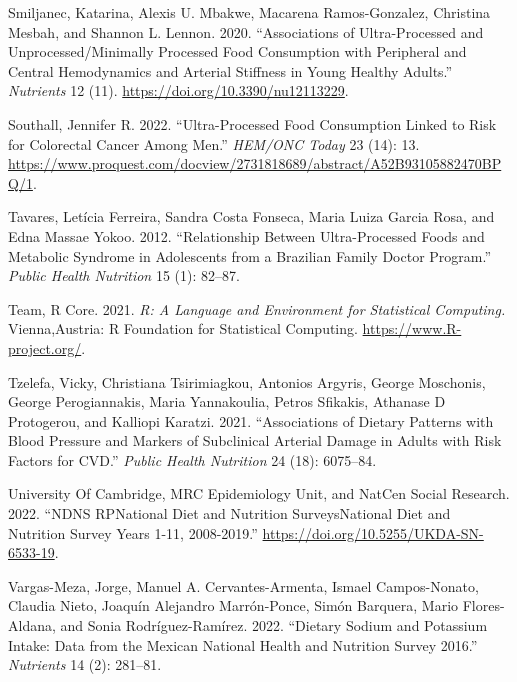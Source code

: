 \documentclass[
]{article}
\newlength{\cslhangindent}
\newlength{\cslentryspacingunit} %
\newenvironment{CSLReferences}[2] %
 {%
  \setlength{\parindent}{0pt}
  \ifodd #1
  \let\oldpar\par
  \def\par{\hangindent=\cslhangindent\oldpar}
  \fi
  \setlength{\parskip}{#2\cslentryspacingunit}
 }%
 {}
\begin{document}
\begin{CSLReferences}{1}{0}
\leavevmode{}%
Smiljanec, Katarina, Alexis U. Mbakwe, Macarena Ramos-Gonzalez,
Christina Mesbah, and Shannon L. Lennon. 2020. {``Associations of
Ultra-Processed and Unprocessed/Minimally Processed Food Consumption
with Peripheral and Central Hemodynamics and Arterial Stiffness in Young
Healthy Adults.''} \emph{Nutrients} 12 (11).
\url{https://doi.org/10.3390/nu12113229}.

\leavevmode{}%
Southall, Jennifer R. 2022. {``Ultra-Processed Food Consumption Linked
to Risk for Colorectal Cancer Among Men.''} \emph{HEM/ONC Today} 23
(14): 13.
\url{https://www.proquest.com/docview/2731818689/abstract/A52B93105882470BPQ/1}.

\leavevmode{}%
Tavares, Letícia Ferreira, Sandra Costa Fonseca, Maria Luiza Garcia
Rosa, and Edna Massae Yokoo. 2012. {``Relationship Between
Ultra-Processed Foods and Metabolic Syndrome in Adolescents from a
{Brazilian Family Doctor Program}.''} \emph{Public Health Nutrition} 15
(1): 82--87.

\leavevmode{}%
Team, R Core. 2021. \emph{R: {A} Language and Environment for
Statistical Computing.} {Vienna,Austria}: {R Foundation for Statistical
Computing}. \url{https://www.R-project.org/}.

\leavevmode{}%
Tzelefa, Vicky, Christiana Tsirimiagkou, Antonios Argyris, George
Moschonis, George Perogiannakis, Maria Yannakoulia, Petros Sfikakis,
Athanase D Protogerou, and Kalliopi Karatzi. 2021. {``Associations of
Dietary Patterns with Blood Pressure and Markers of Subclinical Arterial
Damage in Adults with Risk Factors for {CVD}.''} \emph{Public Health
Nutrition} 24 (18): 6075--84.

\leavevmode{}%
University Of Cambridge, MRC Epidemiology Unit, and NatCen Social
Research. 2022. {``NDNS RPNational Diet and Nutrition SurveysNational
Diet and Nutrition Survey Years 1-11, 2008-2019.''}
\url{https://doi.org/10.5255/UKDA-SN-6533-19}.

\leavevmode{}%
Vargas-Meza, Jorge, Manuel A. Cervantes-Armenta, Ismael Campos-Nonato,
Claudia Nieto, Joaquín Alejandro Marrón-Ponce, Simón Barquera, Mario
Flores-Aldana, and Sonia Rodríguez-Ramírez. 2022. {``Dietary Sodium and
Potassium Intake: {Data} from the Mexican National Health and Nutrition
Survey 2016.''} \emph{Nutrients} 14 (2): 281--81.


\end{CSLReferences}
\end{document}
